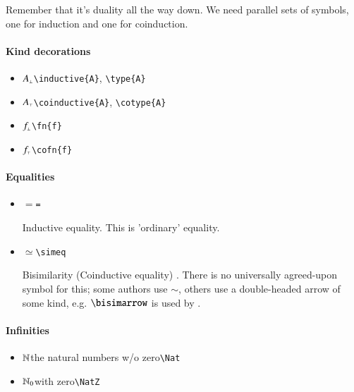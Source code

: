 
Remember that it's duality all the way down. We need parallel sets of symbols, one for induction and one for coinduction.

\paragraph{Kind decorations}

\begin{itemize}
\item \(A_{\scriptscriptstyle\bot}\)\hfill \verb|\inductive{A}|, \verb|\type{A}|
\item \(A_{\scriptscriptstyle\top}\)\hfill \verb|\coinductive{A}|, \verb|\cotype{A}|
\item \(f_{\scriptscriptstyle\bot}\)\hfill \verb|\fn{f}|
\item \(f_{\scriptscriptstyle\top}\)\hfill \verb|\cofn{f}|
\end{itemize}

\paragraph{Equalities}

\begin{itemize}
\item \(=\)\hfill \verb|=|

  Inductive equality. This is 'ordinary' equality.
\item \(\simeq\)\hfill \verb|\simeq|

Bisimilarity (Coinductive equality) . There is no universally
agreed-upon symbol for this; some authors use \(\sim\), others use a
double-headed arrow of some kind, e.g. \(\bisimarrow\) is used by
\parencite{2017intro_coalgebra}.
\end{itemize}

\paragraph{Infinities}

\begin{itemize}
\item \(\mathbb{N}\)\quad the natural numbers w/o zero\hfill \verb|\Nat|
\item \(\mathbb{N}_0\)\quad with zero\hfill \verb|\NatZ|
\end{itemize}

